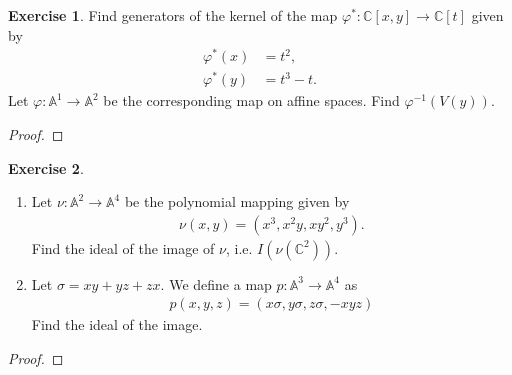 \documentclass[12pt]{extarticle}
\newcommand{\C}{\mathbb{C}}
\newcommand{\<}{\langle}
\renewcommand{\>}{\rangle}
\theoremstyle{definition}
\newtheorem{exercise}{Exercise}
\begin{document}
\begin{exercise}
  Find generators of the kernel of the map $\varphi^*: \C[x,y] \to \C[t]$ given by
  \begin{align*}
    \varphi^*(x) &= t^2, \\
    \varphi^*(y) &= t^3-t.
  \end{align*}
  Let $\varphi: \mathbb{A}^1 \to \mathbb{A}^2$ be the corresponding map on affine spaces. Find $\varphi^{-1}(V(y))$.
\end{exercise}
\begin{proof}
  
\end{proof}
\begin{exercise}
  \begin{enumerate}
  \item
    Let $\nu: \mathbb{A}^2 \to \mathbb{A}^4$ be the polynomial mapping given by
    \begin{align*}
      \nu(x,y) = (x^3, x^2y, xy^2, y^3).
    \end{align*}
    Find the ideal of the image of $\nu$, i.e. $I(\nu(\mathbb{C}^2))$.
  \item
    Let $\sigma = xy + yz + zx.$ We define a map $p: \mathbb{A}^3 \to \mathbb{A}^4$ as
    \begin{align*}
      p(x,y,z)=(x\sigma, y\sigma, z\sigma, -xyz)
    \end{align*}
    Find the ideal of the image.
  \end{enumerate}
\end{exercise}
\begin{proof}
  
\end{proof}
\end{document}
